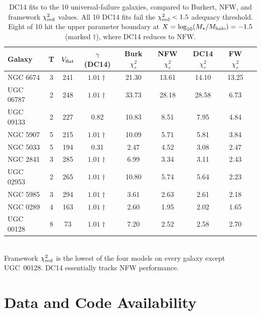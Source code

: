 \begin{table}
\centering
\caption{DC14 fits to the 10 universal-failure galaxies, compared to Burkert, NFW, and framework $\chi^2_{\rm red}$ values. All 10 DC14 fits fail the $\chi^2_{\rm red} < 1.5$ adequacy threshold. Eight of 10 hit the upper parameter boundary at $X = \log_{10}(M_\star/M_{\rm halo}) = -1.5$ (marked $\dagger$), where DC14 reduces to NFW.}
\label{tab:dc14}
\begin{tabular}{lcccccccc}
\toprule
Galaxy & T & $V_{\rm flat}$ & $\gamma$ (DC14) & Burk $\chi^2_r$ & NFW $\chi^2_r$ & DC14 $\chi^2_r$ & FW $\chi^2_r$ \\
\midrule
NGC 6674  & 3 & 241 & $1.01\dagger$ & 21.30 & 13.61 & 14.10 & 13.25 \\
UGC 06787 & 2 & 248 & $1.01\dagger$ & 33.73 & 28.18 & 28.58 & 6.73 \\
UGC 09133 & 2 & 227 & 0.82          & 10.83 & 8.51  & 7.95  & 4.84 \\
NGC 5907  & 5 & 215 & $1.01\dagger$ & 10.09 & 5.71  & 5.81  & 3.84 \\
NGC 5033  & 5 & 194 & 0.31          & 2.47  & 4.52  & 3.08  & 2.47 \\
NGC 2841  & 3 & 285 & $1.01\dagger$ & 6.99  & 3.34  & 3.11  & 2.43 \\
UGC 02953 & 2 & 265 & $1.01\dagger$ & 10.80 & 5.74  & 5.64  & 2.23 \\
NGC 5985  & 3 & 294 & $1.01\dagger$ & 3.61  & 2.63  & 2.61  & 2.18 \\
NGC 0289  & 4 & 163 & $1.01\dagger$ & 2.60  & 1.95  & 2.02  & 1.65 \\
UGC 00128 & 8 & 73  & $1.01\dagger$ & 7.20  & 2.52  & 2.58  & 2.70 \\
\bottomrule
\end{tabular}
\\[0.5em]
\footnotesize{Framework $\chi^2_{\rm red}$ is the lowest of the four models on every galaxy except UGC~00128. DC14 essentially tracks NFW performance.}
\end{table}


\section*{Data and Code Availability}

